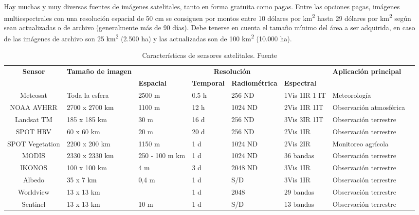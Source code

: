 Hay muchas y muy diversas fuentes de imágenes satelitales, tanto en forma gratuita como pagas. Entre las opciones pagas, imágenes multiespectrales con una resolución espacial de 50 cm se consiguen por montos entre 10 dólares por km\textsuperscript{2} hasta 29 dólares por km\textsuperscript{2} según sean actualizadas o de archivo (generalmente más de 90 días)\cite{noauthor_satellite_2020}. Debe tenerse en cuenta el tamaño mínimo del área a ser adquirida, en caso de las imágenes de archivo son 25 km\textsuperscript{2} (2.500 ha) y las actualizadas son de 100 km\textsuperscript{2} (10.000 ha).
\begin{table}[H]
    \centering
    \caption{Características de sensores satelitales. Fuente \cite{noauthor_3_nodate}}
    \begin{tabular}{c p{20mm} p{15mm} p{15mm} p{25mm} p{20mm}p{20mm} p{20mm}|}
        \hline
        \hline
        \textbf{Sensor} & \textbf{Tamaño de imagen} & \multicolumn{4}{c}{\textbf{Resolución}} & \textbf{Aplicación principal} \\
        & & \textbf{Espacial} & \textbf{Temporal} & \textbf{Radiométrica} & \textbf{Espectral}  &\\
        \hline \hline
        Meteosat & Toda la esfera & 	2500 m 	& 0.5 h 	& 256 ND 	& 1Vis 1IR 1 IT & Meteorología\\
        \hline
        NOAA AVHRR & 2700 x 2700 km	& 1100 m 	 	& 12 h 	& 1024 ND 	& 2Vis 1IR 1IT & Observación atmosférica\\
        \hline
        Landsat TM 	& 185 x 185 km & 30 m 	 	& 16 d 	& 256 ND 	& 3Vis 3IR 1IT & Observación terrestre\\
        \hline
        SPOT HRV & 60 x 60 km	& 20 m 	 	& 20 d	& 256 ND 	& 2Vis 1IR & Observación terrestre\\
        \hline
        SPOT Vegetation & 2200 x 200 km	& 1150 m 	 	& 1 d	& 1024 ND 	& 2Vis 2IR & Monitoreo agrícola\\
        \hline
        MODIS & 2330 x 2330 km	& 250 - 100 m 	 km 	& 1 d	& 1024 ND 	& 36 bandas & Observación terrestre\\
        \hline
        IKONOS & 100 x 100 km	& 4 m 	 	& 3 d 	& 2048 ND 	& 3Vis 1IR & Observación terrestre\\
        \hline
        Albedo & 35 x 7 km & 0,4 m  & 1 d & S/D & 3Vis 1IR & Observación terrestre\\
        \hline
         Worldview & 13 x 13 km &   & 1 d & 2048 & 29 bandas & Observación terrestre\\
        \hline
         Sentinel & 13 x 13 km &  10 m & 1 d & S/D & 13 bandas & Observación terrestre\\
        \hline
        \hline
    \end{tabular}

\label{Satelites}
\end{table}

